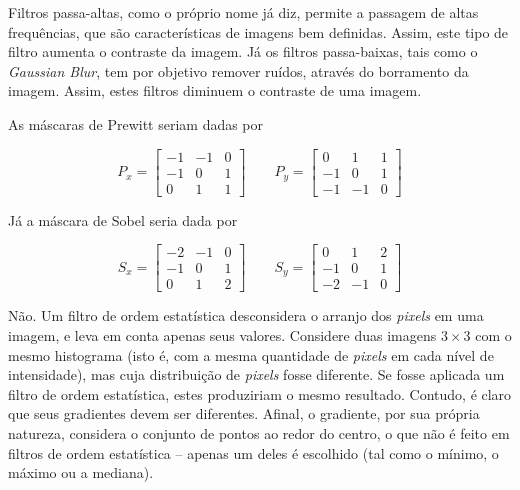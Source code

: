 \documentclass[10pt,a4paper]{article}
\newcommand{\pixels}{\textit{pixels} }
\begin{document}
\begin{enumerate}

Filtros passa-altas, como o próprio nome já diz, permite a passagem de altas frequências, que são características de imagens bem definidas. Assim, este tipo de filtro aumenta o contraste da imagem. Já os filtros passa-baixas, tais como o \textit{Gaussian Blur}, tem por objetivo remover ruídos, através do borramento da imagem. Assim, estes filtros diminuem o contraste de uma imagem.

As máscaras de Prewitt seriam dadas por

\[P_x = \left[\begin{array}{ccc}
  -1 & -1 & 0 \\
  -1 &  0 & 1 \\
  0  &  1 & 1
\end{array}\right]
\qquad
P_y = \left[\begin{array}{ccc}
  0 & 1 & 1 \\
  -1 &  0 & 1 \\
  -1  & -1 & 0
\end{array}\right]
\]

Já a máscara de Sobel seria dada por

\[S_x = \left[\begin{array}{ccc}
  -2 & -1 & 0 \\
  -1 &  0 & 1 \\
  0  &  1 & 2
\end{array}\right]
\qquad
S_y = \left[\begin{array}{ccc}
  0 & 1 & 2 \\
  -1 &  0 & 1 \\
  -2  & -1 & 0
\end{array}\right]
\]

  Não. Um filtro de ordem estatística desconsidera o arranjo dos \pixels em uma imagem, e leva em conta apenas seus valores. Considere duas imagens $3\times3$ com o mesmo histograma (isto é, com a mesma quantidade de \pixels em cada nível de intensidade), mas cuja distribuição de \pixels fosse diferente. Se fosse aplicada um filtro de ordem estatística, estes produziriam o mesmo resultado. Contudo, é claro que seus gradientes devem ser diferentes. Afinal, o gradiente, por sua própria natureza, considera o conjunto de pontos ao redor do centro, o que não é feito em filtros de ordem estatística -- apenas um deles é escolhido (tal como o mínimo, o máximo ou a mediana).
\end{enumerate}
\end{document}
